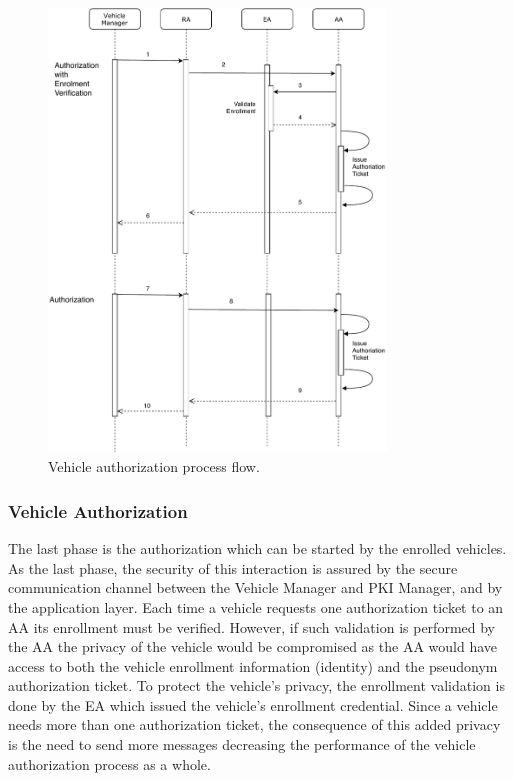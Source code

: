 \begin{figure}
	\centering
	\includegraphics[width=0.8\textwidth]{Figures/protocolo_2}
	\caption{\label{fig:protocol_2}Vehicle authorization process flow.}
\end{figure} 

\subsubsection{Vehicle Authorization} \label{auth}
The last phase is the authorization which can be started by the enrolled vehicles. As the last phase, the security of this interaction is assured by the secure communication channel between the Vehicle Manager and PKI Manager, and by the application layer. Each time a vehicle requests one authorization ticket to an AA its enrollment must be verified. However, if such validation is performed by the AA the privacy of the vehicle would be compromised as the AA would have access to both the vehicle enrollment information (identity) and the pseudonym authorization ticket. To protect the vehicle's privacy, the enrollment validation is done by the EA which issued the vehicle's enrollment credential. Since a vehicle needs more than one authorization ticket, the consequence of this added privacy is the need to send more messages decreasing the performance of the vehicle authorization process as a whole. 

